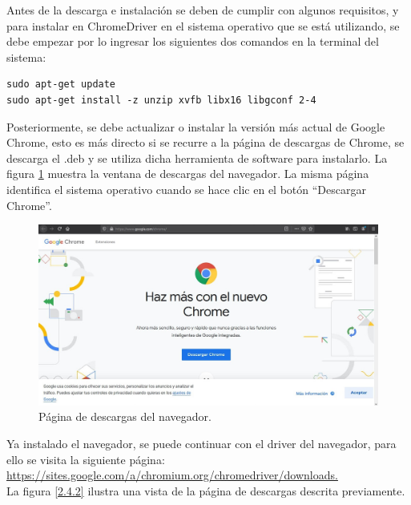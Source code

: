 {{\noindent Antes de la descarga e instalación se deben de cumplir con algunos requisitos, y para instalar en ChromeDriver en el sistema operativo que se está utilizando, se debe empezar por lo ingresar los siguientes dos comandos en la terminal del sistema:
\begin{lstlisting}
sudo apt-get update
sudo apt-get install -z unzip xvfb libx16 libgconf 2-4
\end{lstlisting}

\noindent Posteriormente, se debe actualizar o instalar la versión más actual de Google Chrome, esto es más directo si se recurre a la página de descargas de Chrome, se descarga el .deb y se utiliza dicha herramienta de software para instalarlo.
La figura \ref{2.4.1} muestra la ventana de descargas del navegador. La misma página identifica el sistema operativo cuando se hace clic en el botón “Descargar Chrome”.

\begin{figure}[H]
    \centering
    \includegraphics[scale=0.52]{Capitulo4/Documentos/imagenes_entorno/figura2-4-1.jpg}
    \caption{Página de descargas del navegador.}
    \label{2.4.1}
\end{figure}

Ya instalado el navegador, se puede continuar con el driver del navegador, para ello se visita la siguiente página:\\

\href{https://sites.google.com/a/chromium.org/chromedriver/downloads.}{https://sites.google.com/a/chromium.org/chromedriver/downloads.}\\

\noindent La figura \ref{2.4.2} ilustra una vista de la página de descargas descrita previamente.

}}
